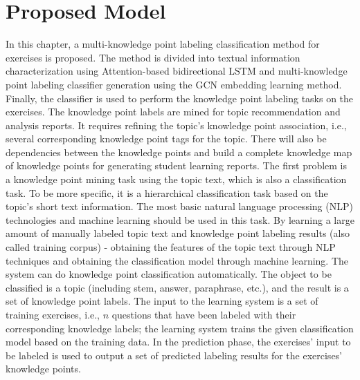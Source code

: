 \section{Proposed Model}
In this chapter, a multi-knowledge point labeling classification method for exercises is proposed. The method is divided into textual information characterization using Attention-based bidirectional LSTM and multi-knowledge point labeling classifier generation using the GCN embedding learning method. Finally, the classifier is used to perform the knowledge point labeling tasks on the exercises. The knowledge point labels are mined for topic recommendation and analysis reports. It requires refining the topic's knowledge point association, i.e., several corresponding knowledge point tags for the topic. There will also be dependencies between the knowledge points and build a complete knowledge map of knowledge points for generating student learning reports. The first problem is a knowledge point mining task using the topic text, which is also a classification task. To be more specific, it is a hierarchical classification task based on the topic's short text information. The most basic natural language processing (NLP) technologies and machine learning should be used in this task. By learning a large amount of manually labeled topic text and knowledge point labeling results (also called training corpus) - obtaining the features of the topic text through NLP techniques and obtaining the classification model through machine learning. The system can do knowledge point classification automatically. The object to be classified is a topic (including stem, answer, paraphrase, etc.), and the result is a set of knowledge point labels. The input to the learning system is a set of training exercises, i.e., \(n\) questions that have been labeled with their corresponding knowledge labels; the learning system trains the given classification model based on the training data. In the prediction phase, the exercises' input to be labeled is used to output a set of predicted labeling results for the exercises' knowledge points.



